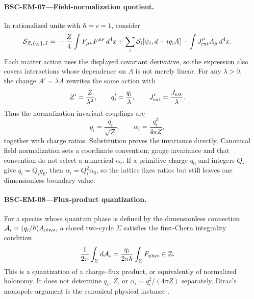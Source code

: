\documentclass[11pt,a4paper]{article}
\theoremstyle{definition}
\theoremstyle{plain}
\theoremstyle{remark}
\begin{document}
\paragraph{\textbf{BSC-EM-07}---Field-normalization quotient.}
In rationalized units with \(\hbar=c=1\), consider
\[
\mathcal S_{Z,\{q_i\},J}
={}-\frac Z4\int F_{\mu\nu}F^{\mu\nu}\,d^4x
+ \sum_i\mathcal S_i[\psi_i,d+iq_iA]
- \int J_{\rm ext}^{\mu}A_\mu\,d^4x .
\]
Each matter action uses the displayed covariant derivative, so the expression
also covers interactions whose dependence on \(A\) is not merely linear.
For any \(\lambda>0\), the change \(A'=\lambda A\) rewrites the same action
with
\[
Z'=\frac Z{\lambda^2},
\qquad
q_i'=\frac{q_i}{\lambda},
\qquad
J_{\rm ext}'=\frac{J_{\rm ext}}{\lambda}.
\]
Thus the normalization-invariant couplings are
\[
g_i=\frac{q_i}{\sqrt Z},
\qquad
\alpha_i=\frac{q_i^2}{4\pi Z},
\]
together with charge ratios.  Substitution proves the invariance directly.
Canonical field normalization sets a coordinate convention; gauge invariance
and that convention do not select a numerical \(\alpha_i\).  If a primitive
charge \(q_0\) and integers \(Q_i\) give \(q_i=Q_iq_0\), then
\(\alpha_i=Q_i^2\alpha_0\), so the lattice fixes ratios but still leaves one
dimensionless boundary value.

\paragraph{\textbf{BSC-EM-08}---Flux-product quantization.}
For a species whose quantum phase is defined by the dimensionless connection
\(\mathcal A_i=(q_i/\hbar)A_{\rm phys}\), a closed two-cycle \(\Sigma\)
satisfies the first-Chern integrality condition
\[
\frac1{2\pi}\int_\Sigma d\mathcal A_i
=\frac{q_i}{2\pi\hbar}\int_\Sigma F_{\rm phys}
\in\mathbb Z .
\]
This is a quantization of a charge--flux product, or equivalently of
normalized holonomy.  It does not determine \(q_i\), \(Z\), or
\(\alpha_i=q_i^2/(4\pi Z)\) separately.  Dirac's monopole argument is the
canonical physical instance \citep{dirac1931}.
\end{document}
